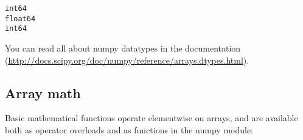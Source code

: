 \documentclass[11pt]{article}
\begin{document}
    \begin{Verbatim}[commandchars=\\\{\}]
int64
float64
int64

    \end{Verbatim}

    You can read all about numpy datatypes in the documentation
(\url{http://docs.scipy.org/doc/numpy/reference/arrays.dtypes.html}).

    \subsection{Array math}\label{array-math}

Basic mathematical functions operate elementwise on arrays, and are
available both as operator overloads and as functions in the numpy
module:
\end{document}
